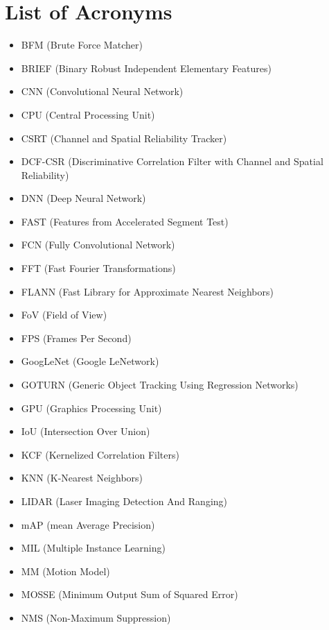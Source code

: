 {}
\listoffigures
\clearpage

{}
\listoftables
\clearpage


\chapter*{List of Acronyms}
\begin{itemize}
	\item BFM (Brute Force Matcher)
	\item BRIEF (Binary Robust Independent Elementary Features)
	\item CNN (Convolutional Neural Network)
	\item CPU (Central Processing Unit)
	\item CSRT (Channel and Spatial Reliability Tracker)
	\item DCF-CSR (Discriminative Correlation Filter with Channel and Spatial Reliability)
	\item DNN (Deep Neural Network)
	\item FAST (Features from Accelerated Segment Test)
	\item FCN (Fully Convolutional Network)
	\item FFT (Fast Fourier Transformations)
	\item FLANN (Fast Library for Approximate Nearest Neighbors)
	\item FoV (Field of View)
	\item FPS (Frames Per Second)
	\item GoogLeNet (Google LeNetwork)
	\item GOTURN (Generic Object Tracking Using Regression Networks)
	\item GPU (Graphics Processing Unit)
	\item IoU (Intersection Over Union)
	\item KCF (Kernelized Correlation Filters)
	\item KNN (K-Nearest Neighbors)
	\item LIDAR (Laser Imaging Detection And Ranging)
	\item mAP (mean Average Precision)
	\item MIL (Multiple Instance Learning)
	\item MM (Motion Model)
	\item MOSSE (Minimum Output Sum of Squared Error)
	\item NMS (Non-Maximum Suppression)

\end{itemize}
